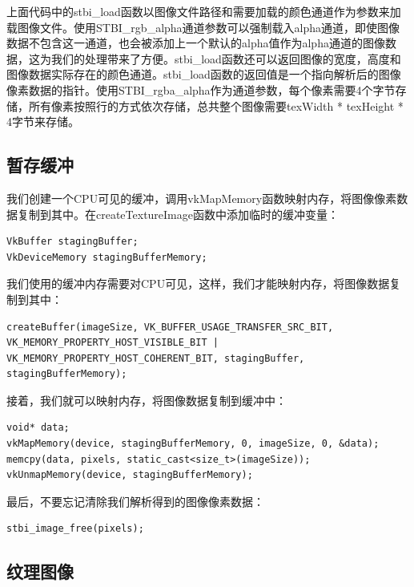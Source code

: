 \documentclass{ctexart}
\begin{document}
上面代码中的stbi\_load函数以图像文件路径和需要加载的颜色通道作为参数来加载图像文件。使用STBI\_rgb\_alpha通道参数可以强制载入alpha通道，即使图像数据不包含这一通道，也会被添加上一个默认的alpha值作为alpha通道的图像数据，这为我们的处理带来了方便。stbi\_load函数还可以返回图像的宽度，高度和图像数据实际存在的颜色通道。stbi\_load函数的返回值是一个指向解析后的图像像素数据的指针。使用STBI\_rgba\_alpha作为通道参数，每个像素需要4个字节存储，所有像素按照行的方式依次存储，总共整个图像需要texWidth * texHeight * 4字节来存储。

\subsection{暂存缓冲}

我们创建一个CPU可见的缓冲，调用vkMapMemory函数映射内存，将图像像素数据复制到其中。在createTextureImage函数中添加临时的缓冲变量：

\begin{lstlisting}[language={[ANSI]C}]
VkBuffer stagingBuffer;
VkDeviceMemory stagingBufferMemory;
\end{lstlisting}

我们使用的缓冲内存需要对CPU可见，这样，我们才能映射内存，将图像数据复制到其中：

\begin{lstlisting}[language={[ANSI]C}]
createBuffer(imageSize, VK_BUFFER_USAGE_TRANSFER_SRC_BIT, VK_MEMORY_PROPERTY_HOST_VISIBLE_BIT | VK_MEMORY_PROPERTY_HOST_COHERENT_BIT, stagingBuffer, stagingBufferMemory);
\end{lstlisting}

接着，我们就可以映射内存，将图像数据复制到缓冲中：

\begin{lstlisting}[language={[ANSI]C}]
void* data;
vkMapMemory(device, stagingBufferMemory, 0, imageSize, 0, &data);
memcpy(data, pixels, static_cast<size_t>(imageSize));
vkUnmapMemory(device, stagingBufferMemory);
\end{lstlisting}

最后，不要忘记清除我们解析得到的图像像素数据：

\begin{lstlisting}[language={[ANSI]C}]
stbi_image_free(pixels);
\end{lstlisting}

\subsection{纹理图像}
\end{document}
